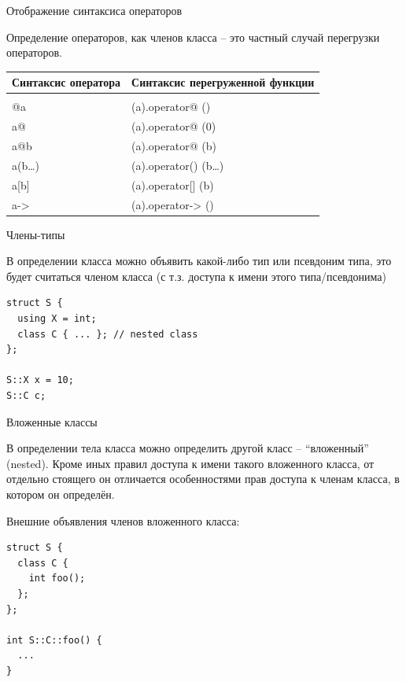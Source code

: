 \documentclass[unknownkeysallowed,xcolor=table]{beamer}
\begin{document}
\begin{frame}[fragile]{Отображение синтаксиса операторов}

Определение операторов, как членов класса -- это частный случай перегрузки операторов.

\begin{center}
\begin{tabular}{ l l }
  \hline
    Синтаксис оператора & Синтаксис перегруженной функции \\
  \hline
    &\\
    @a & (a).operator@ () \\
    a@ & (a).operator@ (0) \\
    a@b & (a).operator@ (b) \\
    a(b…) & (a).operator() (b…) \\
    a[b] & (a).operator[] (b) \\
    a-> & (a).operator-> () \\
\end{tabular}
\end{center}

\end{frame}

\begin{frame}[fragile]{Члены-типы}

В определении класса можно объявить какой-либо тип или псевдоним типа, это будет считаться членом класса (с т.з. доступа к имени этого типа/псевдонима)

\vspace{2em}

\begin{lstlisting}
struct S {
  using X = int;
  class C { ... }; // nested class
};

S::X x = 10;
S::C c;
\end{lstlisting}

\end{frame}

\begin{frame}[fragile]{Вложенные классы}

В определении тела класса можно определить другой класс -- ``вложенный'' (nested). Кроме иных правил доступа к имени такого вложенного класса, от отдельно стоящего он отличается особенностями прав доступа к членам класса, в котором он определён.

\vspace{1em}

Внешние объявления членов вложенного класса:
\begin{lstlisting}
struct S {
  class C {
    int foo();
  };
};

int S::C::foo() {
  ...
}
\end{lstlisting}

\end{frame}
\end{document}
